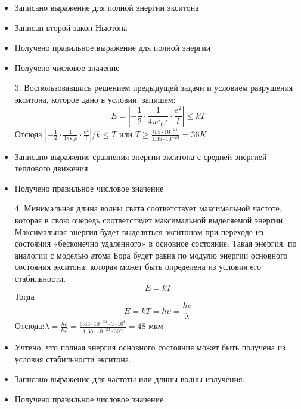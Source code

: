 \additionalCriteria
\begin{itemize}
\item Записано выражение для полной энергии экситона 
\item Записан второй закон Ньютона
\item Получено правильное выражение для полной энергии
\item Получено числовое значение
\end{itemize}
\begin{enumerate}
\item[3.] Воспользовавшись решением предыдущей задачи и условием разрушения экситона, которое дано в условии, запишем:
$$E=\left|-\frac{1}{2}\cdot\frac{1}{4\pi\varepsilon_0\varepsilon}\cdot\frac{e^2}{l}\right|\leqslant kT$$
Отсюда $\left|-\frac{1}{2}\cdot\frac{1}{4\pi\varepsilon_0\varepsilon}\cdot\frac{e^2}{l}\right|/k\leqslant T$ или $T \geqslant\frac{0.5\cdot10^{-21}}{1.38\cdot10^{-23}}=36K$\\
\end{enumerate}
\additionalCriteria\begin{itemize}
\item Записано выражение сравнения энергии экситона с средней энергией теплового движения.
\item Получено правильное числовое значение
\end{itemize}
\begin{enumerate}
\item[4.] Минимальная длина волны света соответствует максимальной частоте, которая в свою очередь соответствует максимальной выделяемой энергии. Максимальная энергия будет выделяться экситоном при переходе из состояния «бесконечно удаленного» в основное состояние. Такая энергия, по аналогии с моделью атома Бора будет равна по модулю энергии основного состояния экситона, которая может быть определена из условия его стабильности.\\
$$E=kT$$
Тогда 
$$E=kT=h\upsilon=\frac{hc}{\lambda}$$
Отсюда:$\lambda=\frac{hc}{kT}=\frac{6.63\cdot10^{-34}\cdot3\cdot10^8}{1.38\cdot10^{-23}\cdot300}=48$ мкм\\
\end{enumerate}
\additionalCriteria
\begin{itemize}
\item Учтено, что полная энергия основного состояния может быть получена из условия стабильности экситона.
\item Записано выражение для частоты или длины волны излучения.
\item Получено правильное числовое значение
\end{itemize}
